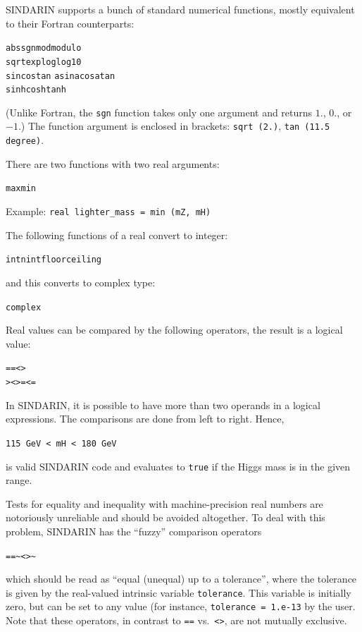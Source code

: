 \documentclass[12pt]{book}
\newcommand{\ttt}[1]{\texttt{#1}}
\begin{document}
SINDARIN supports a bunch of standard numerical functions, mostly equivalent
to their Fortran counterparts:
\begin{center}
  \ttt{abs}\quad \ttt{sgn}\quad \ttt{mod}\quad \ttt{modulo}
\\
  \ttt{sqrt}\quad \ttt{exp}\quad \ttt{log}\quad \ttt{log10}
\\
  \ttt{sin}\quad \ttt{cos}\quad \ttt{tan}\quad 
  \ttt{asin}\quad \ttt{acos}\quad \ttt{atan}
\\
  \ttt{sinh}\quad \ttt{cosh}\quad \ttt{tanh}
\end{center}
(Unlike Fortran, the \ttt{sgn} function takes only one argument and returns
$1.$, $0.$, or $-1.$) The function argument is enclosed in brackets: \ttt{sqrt
  (2.)}, \ttt{tan (11.5 degree)}.

There are two functions with two real arguments:
\begin{center}
  \ttt{max}\quad \ttt{min}
\end{center}
Example: \verb|real lighter_mass = min (mZ, mH)|

The following functions of a real convert to integer:
\begin{center}
  \ttt{int}\quad \ttt{nint}\quad \ttt{floor}\quad \ttt{ceiling}
\end{center}
and this converts to complex type:
\begin{center}
  \ttt{complex}
\end{center}

Real values can be compared by the following operators, the result is a
logical value:
\begin{center}
  \verb|==|\quad \verb|<>|
\\
  \verb|>|\quad \verb|<|\quad \verb|>=|\quad \verb|<=|
\end{center}
In SINDARIN, it is possible to have more than two operands in a logical
expressions.  The comparisons are done from left to right.  Hence,
\begin{center}
  \verb|115 GeV < mH < 180 GeV|
\end{center}
is valid SINDARIN code and evaluates to \ttt{true} if the Higgs mass is in the
given range.

Tests for equality and inequality with machine-precision real numbers are
notoriously unreliable and should be avoided altogether.  To deal with this
problem, SINDARIN has the ``fuzzy'' comparison operators
\begin{center}
  \verb|==~|\quad \verb|<>~|
\end{center}
which should be read as ``equal (unequal) up to a tolerance'', where the
tolerance is given by the real-valued intrinsic variable \ttt{tolerance}.
This variable is initially zero, but can be set to any value (for instance,
\ttt{tolerance = 1.e-13} by the user.  Note that these operators, in contrast
to \verb|==| vs.\ \verb|<>|, are not mutually exclusive.
\end{document}
